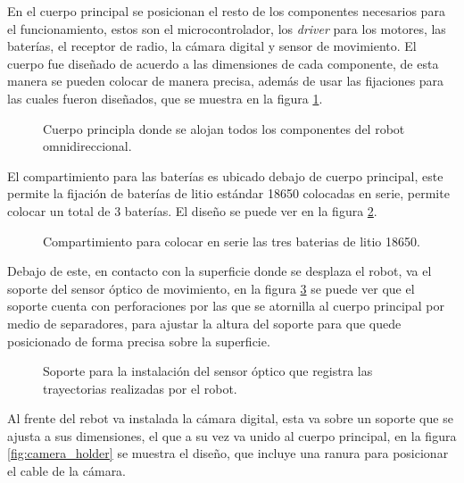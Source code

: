 \documentclass{iccmemoria}
\begin{document}
En el cuerpo principal se posicionan el resto de los componentes necesarios para el funcionamiento, estos son el microcontrolador, los \emph{driver} para los motores, las baterías, el receptor de radio, la cámara digital y sensor de movimiento. El cuerpo fue diseñado de acuerdo a las dimensiones de cada componente, de esta manera se pueden colocar de manera precisa, además de usar las fijaciones para las cuales fueron diseñados, que se muestra en la figura \ref{fig:frame}.\\

\begin{figure}[H]
  \centering
  
  \caption{Cuerpo principla donde se alojan todos los componentes del robot omnidireccional.}
  \label{fig:frame}
\end{figure}

El compartimiento para las baterías es ubicado debajo de cuerpo principal, este permite la fijación de baterías de litio estándar 18650 colocadas en serie, permite colocar un total de 3 baterías. El diseño se puede ver en la figura \ref{fig:battery_compartment}.

\begin{figure}[H]
  \centering
  
  \caption{Compartimiento para colocar en serie las tres baterias de litio 18650.}
  \label{fig:battery_compartment}
\end{figure}

Debajo de este, en contacto con la superficie donde se desplaza el robot, va el soporte del sensor óptico de movimiento, en la figura \ref{fig:mouse_holder} se puede ver que el soporte cuenta con perforaciones por las que se atornilla al cuerpo principal por medio de separadores, para ajustar la altura del soporte para que quede posicionado de forma precisa sobre la superficie.\\

\begin{figure}[H]
  \centering
  
  \caption{Soporte para la instalación del sensor óptico que registra las trayectorias realizadas por el robot.}
  \label{fig:mouse_holder}
\end{figure}

Al frente del rebot va instalada la cámara digital, esta va sobre un soporte que se ajusta a sus dimensiones, el que a su vez va unido al cuerpo principal, en la figura \ref{fig:camera_holder} se muestra el diseño, que incluye una ranura para posicionar el cable de la cámara.\\
\end{document}
